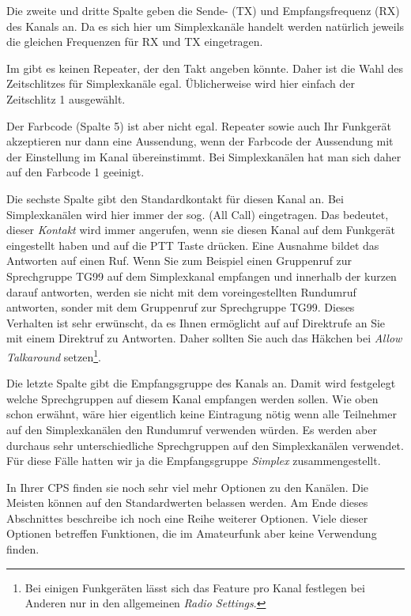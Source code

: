 Die zweite und dritte Spalte geben die Sende- (TX) und Empfangsfrequenz (RX) des Kanals an. Da es sich hier um Simplexkanäle handelt werden natürlich jeweils die gleichen Frequenzen für RX und TX eingetragen. 

Im  gibt es keinen Repeater, der den Takt angeben könnte. Daher ist die Wahl des Zeitschlitzes für Simplexkanäle egal. Üblicherweise wird hier einfach der Zeitschlitz 1 ausgewählt.

Der Farbcode (Spalte 5) ist aber nicht egal. Repeater sowie auch Ihr Funkgerät akzeptieren nur dann eine Aussendung, wenn der Farbcode der Aussendung mit der Einstellung im Kanal übereinstimmt. Bei Simplexkanälen hat man sich daher auf den Farbcode 1 geeinigt. 

Die sechste Spalte gibt den Standardkontakt für diesen Kanal an. Bei Simplexkanälen wird hier immer der sog.  (All Call) eingetragen. Das bedeutet, dieser \emph{Kontakt} wird immer angerufen, wenn sie diesen Kanal auf dem Funkgerät eingestellt haben und auf die PTT Taste drücken. Eine Ausnahme bildet das Antworten auf einen Ruf. Wenn Sie zum Beispiel einen Gruppenruf zur Sprechgruppe TG99 auf dem Simplexkanal empfangen und innerhalb der kurzen  darauf antworten, werden sie nicht mit dem voreingestellten Rundumruf antworten, sonder mit dem Gruppenruf zur Sprechgruppe TG99. Dieses Verhalten ist sehr erwünscht, da es Ihnen ermöglicht auf auf Direktrufe an Sie mit einem Direktruf zu Antworten. Daher sollten Sie auch das Häkchen bei \emph{Allow Talkaround} setzen\footnote{Bei einigen Funkgeräten lässt sich das Feature pro Kanal festlegen bei Anderen nur in den allgemeinen \emph{Radio Settings}.}.  

Die letzte Spalte gibt die Empfangsgruppe des Kanals an. Damit wird festgelegt welche Sprechgruppen auf diesem Kanal empfangen werden sollen. Wie oben schon erwähnt, wäre hier eigentlich keine Eintragung nötig wenn alle Teilnehmer auf den Simplexkanälen den Rundumruf verwenden würden. Es werden aber durchaus sehr unterschiedliche Sprechgruppen auf den Simplexkanälen verwendet. Für diese Fälle hatten wir ja die Empfangsgruppe \emph{Simplex} zusammengestellt. 

In Ihrer CPS finden sie noch sehr viel mehr Optionen zu den Kanälen. Die Meisten können auf den Standardwerten belassen werden. Am Ende dieses Abschnittes beschreibe ich noch eine Reihe weiterer Optionen. Viele dieser Optionen betreffen Funktionen, die im Amateurfunk aber keine Verwendung finden. 

